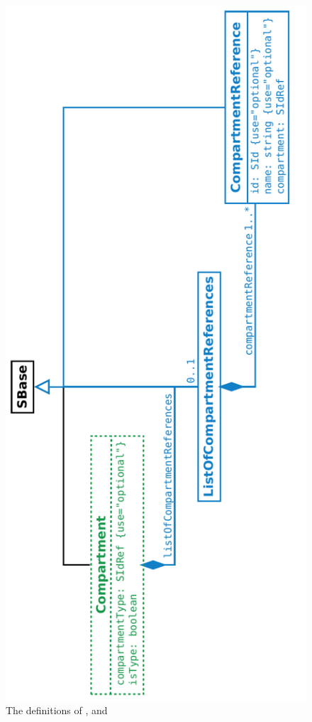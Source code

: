 \begin{figure}[htb]
  \begin{center}
    \includegraphics[angle=-90, scale=0.6]{./figs/multi_012_compartment.pdf}
    \caption{The definitions of \ExCompartment, \ListOfCompartmentReferences and \CompartmentReference}
  \label{fig:Compartment_components}
  \end{center}
\end{figure}

